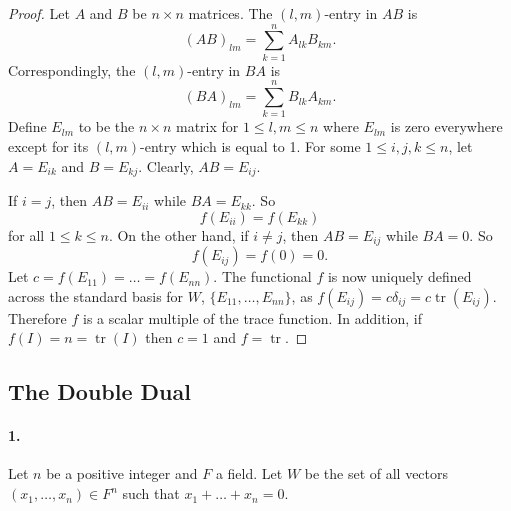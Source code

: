 \documentclass{article}
\DeclareMathOperator{\tr}{tr}
\begin{document}
\begin{proof}
  Let $A$ and $B$ be $n \times n$ matrices. The $(l, m)$-entry in $AB$ is \[
    (AB)_{lm} = \sum_{k=1}^n A_{lk}B_{km}.
  \] Correspondingly, the $(l, m)$-entry in $BA$ is \[
    (BA)_{lm} = \sum_{k=1}^n B_{lk}A_{km}.
  \] Define $E_{lm}$ to be the $n \times n$ matrix for $1 \leq l, m \leq n$
  where $E_{lm}$ is zero everywhere except for its $(l, m)$-entry which is equal
  to 1. For some $1 \leq i, j, k \leq n$, let $A = E_{ik}$ and $B = E_{kj}$.
  Clearly, $AB = E_{ij}$.

  If $i = j$, then $AB = E_{ii}$ while $BA = E_{kk}$. So \[
    f(E_{ii}) = f(E_{kk})
  \] for all $1 \leq k \leq n$. On the other hand, if $i \neq j$, then $AB =
  E_{ij}$ while $BA = 0$. So \[
    f(E_{ij}) = f(0) = 0.
  \] Let $c = f(E_{11}) = \ldots = f(E_{nn})$. The functional $f$ is now
  uniquely defined across the standard basis for $W$, $\{E_{11}, \ldots,
  E_{nn}\}$, as $f(E_{ij}) = c\delta_{ij} = c\tr(E_{ij})$. Therefore $f$ is a
  scalar multiple of the trace function. In addition, if $f(I) = n = \tr(I)$
  then $c = 1$ and $f = \tr$.
\end{proof}

\subsection{The Double Dual}

\paragraph{1.} Let $n$ be a positive integer and $F$ a field. Let $W$ be the set
of all vectors $(x_1, \ldots, x_n) \in F^n$ such that $x_1 + \ldots + x_n = 0$.
\end{document}

